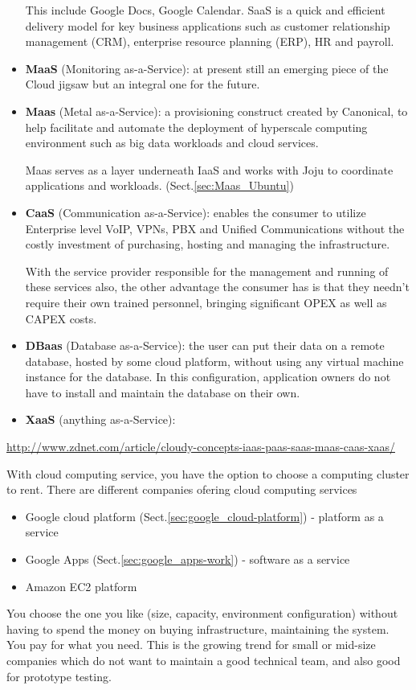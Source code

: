 \begin{itemize}
  This include Google Docs, Google Calendar.
  SaaS is a quick and efficient delivery model for key business applications
   such as customer relationship management (CRM), enterprise resource planning
   (ERP), HR and payroll. 
  
  \item {\bf MaaS} (Monitoring as-a-Service): at present still an emerging piece
  of the Cloud jigsaw but an integral one for the future. 
  
  \item {\bf Maas} (Metal as-a-Service): a provisioning construct created by
  Canonical, to help facilitate and automate the deployment of hyperscale
  computing environment such as big data workloads and cloud services. 
  
  Maas serves as a layer underneath IaaS and works with Joju to coordinate
  applications and workloads. (Sect.\ref{sec:Maas_Ubuntu})
  
  
  \item {\bf CaaS} (Communication as-a-Service):  enables the consumer to
  utilize Enterprise level VoIP, VPNs, PBX and Unified Communications without
  the costly investment of purchasing, hosting and managing the infrastructure.
  
  
  With the service provider responsible for the management and running of these
  services also, the other advantage the consumer has is that they needn't
  require their own trained personnel, bringing significant OPEX as well as CAPEX costs. 
  
  \item {\bf DBaas} (Database as-a-Service): the user can put their data on a
  remote database, hosted by some cloud platform, without using any virtual machine
  instance for the database. In this configuration, application owners do not
  have to install and maintain the database on their own. 
  
  
  \item {\bf XaaS} (anything as-a-Service):  
  
\end{itemize}
 \url{http://www.zdnet.com/article/cloudy-concepts-iaas-paas-saas-maas-caas-xaas/}
 
With cloud computing service, you have the option to choose a computing cluster
to rent. There are different companies ofering cloud computing services 
\begin{itemize}
  \item Google cloud platform (Sect.\ref{sec:google_cloud-platform}) - platform
  as a service
  \item Google Apps (Sect.\ref{sec:google_apps-work}) - software as a service
  
  \item Amazon EC2 platform
\end{itemize}
You choose the one you like (size, capacity, environment configuration) without
having to spend the money on buying infrastructure, maintaining the system. You
pay for what you need. This is the growing trend for small or mid-size companies
which do not want to maintain a good technical team, and also good for prototype
testing.

